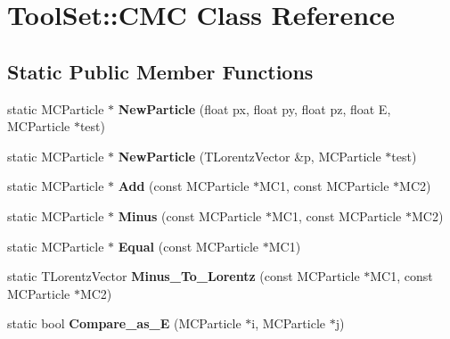 \hypertarget{classToolSet_1_1CMC}{
\section{ToolSet::CMC Class Reference}
\label{classToolSet_1_1CMC}
}
\subsection*{Static Public Member Functions}
\begin{DoxyCompactItemize}
\item 
\hypertarget{classToolSet_1_1CMC_ab30c29f999f2b3dd1c85ed68636f2281}{
static MCParticle $\ast$ {\bfseries NewParticle} (float px, float py, float pz, float E, MCParticle $\ast$test)}
\label{classToolSet_1_1CMC_ab30c29f999f2b3dd1c85ed68636f2281}

\item 
\hypertarget{classToolSet_1_1CMC_a5bd1a7515135570ef348bd77d1d26933}{
static MCParticle $\ast$ {\bfseries NewParticle} (TLorentzVector \&p, MCParticle $\ast$test)}
\label{classToolSet_1_1CMC_a5bd1a7515135570ef348bd77d1d26933}

\item 
\hypertarget{classToolSet_1_1CMC_ad1b2172aaacc40d4f5971492a5d1a0f5}{
static MCParticle $\ast$ {\bfseries Add} (const MCParticle $\ast$MC1, const MCParticle $\ast$MC2)}
\label{classToolSet_1_1CMC_ad1b2172aaacc40d4f5971492a5d1a0f5}

\item 
\hypertarget{classToolSet_1_1CMC_aa597db31bacbc37cbc16da5bfe2b1d9a}{
static MCParticle $\ast$ {\bfseries Minus} (const MCParticle $\ast$MC1, const MCParticle $\ast$MC2)}
\label{classToolSet_1_1CMC_aa597db31bacbc37cbc16da5bfe2b1d9a}

\item 
\hypertarget{classToolSet_1_1CMC_a29838e430204b6f0d6e5cdf8a669f615}{
static MCParticle $\ast$ {\bfseries Equal} (const MCParticle $\ast$MC1)}
\label{classToolSet_1_1CMC_a29838e430204b6f0d6e5cdf8a669f615}

\item 
\hypertarget{classToolSet_1_1CMC_acd7ded5c44d40de05109435f43ca5ae3}{
static TLorentzVector {\bfseries Minus\_\-To\_\-Lorentz} (const MCParticle $\ast$MC1, const MCParticle $\ast$MC2)}
\label{classToolSet_1_1CMC_acd7ded5c44d40de05109435f43ca5ae3}

\item 
\hypertarget{classToolSet_1_1CMC_a709d30e4a5670f116128a1602a6b25c0}{
static bool {\bfseries Compare\_\-as\_\-E} (MCParticle $\ast$i, MCParticle $\ast$j)}
\label{classToolSet_1_1CMC_a709d30e4a5670f116128a1602a6b25c0}


\end{DoxyCompactItemize}
